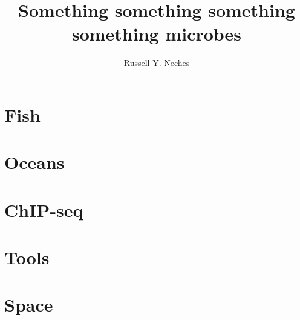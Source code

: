 \documentclass[PhD]{ucdavisthesis}
\title{Something something something something microbes}
\author{Russell Y. Neches}
\begin{document}
\makeintropages

%

\begin{refsection}
\newrefsection

\end{refsection}

\part{Fish}





\part{Oceans}





\part{ChIP-seq}




\part{Tools}




\part{Space}



\end{document}
